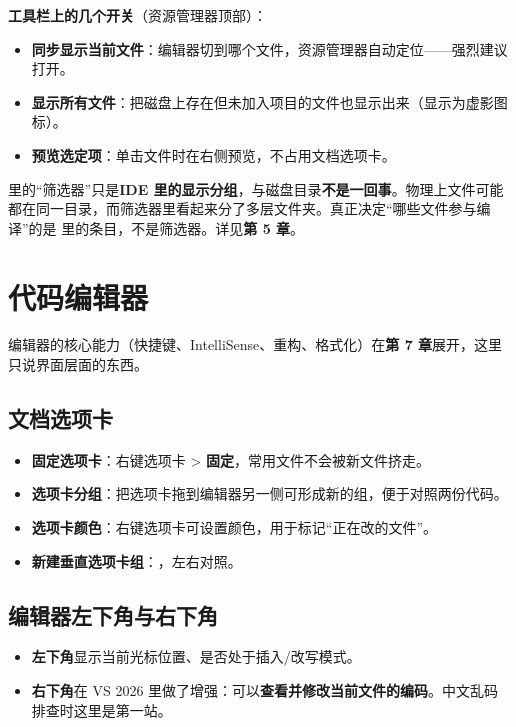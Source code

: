 \textbf{工具栏上的几个开关}（资源管理器顶部）：

\begin{itemize}
	\item \textbf{同步显示当前文件}：编辑器切到哪个文件，资源管理器自动定位——强烈建议打开。
	\item \textbf{显示所有文件}：把磁盘上存在但未加入项目的文件也显示出来（显示为虚影图标）。
	\item \textbf{预览选定项}：单击文件时在右侧预览，不占用文档选项卡。
\end{itemize}

\begin{warnbox}[注意]
 里的“筛选器”只是\textbf{IDE 里的显示分组}，与磁盘目录\textbf{不是一回事}。物理上文件可能都在同一目录，而筛选器里看起来分了多层文件夹。真正决定“哪些文件参与编译”的是  里的条目，不是筛选器。详见\textbf{第 5 章}。
\end{warnbox}

\section{代码编辑器}

编辑器的核心能力（快捷键、IntelliSense、重构、格式化）在\textbf{第 7 章}展开，这里只说界面层面的东西。

\subsection{文档选项卡}

\begin{itemize}
	\item \textbf{固定选项卡}：右键选项卡 > \textbf{固定}，常用文件不会被新文件挤走。
	\item \textbf{选项卡分组}：把选项卡拖到编辑器另一侧可形成新的组，便于对照两份代码。
	\item \textbf{选项卡颜色}：右键选项卡可设置颜色，用于标记“正在改的文件”。
	\item \textbf{新建垂直选项卡组}：，左右对照。
\end{itemize}

\subsection{编辑器左下角与右下角}

\begin{itemize}
	\item \textbf{左下角}显示当前光标位置、是否处于插入/改写模式。
	\item \textbf{右下角}在 VS 2026 里做了增强：可以\textbf{查看并修改当前文件的编码}。中文乱码排查时这里是第一站。
\end{itemize}

